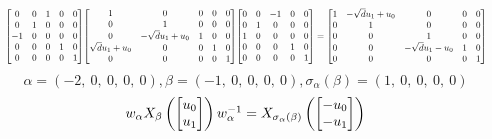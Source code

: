 \documentclass[11pt]{article}
\theoremstyle{definition}
\begin{document}
\[
\scaletoalign{\textwidth}{{\left[\begin{matrix}0 & 0 & 1 & 0 & 0\\0 & 1 & 0 & 0 & 0\\-1 & 0 & 0 & 0 & 0\\0 & 0 & 0 & 1 & 0\\0 & 0 & 0 & 0 & 1\end{matrix}\right]} {\left[\begin{matrix}1 & 0 & 0 & 0 & 0\\0 & 1 & 0 & 0 & 0\\0 & - \sqrt{d} u_{1} + u_{0} & 1 & 0 & 0\\\sqrt{d} u_{1} + u_{0} & 0 & 0 & 1 & 0\\0 & 0 & 0 & 0 & 1\end{matrix}\right]} {\left[\begin{matrix}0 & 0 & -1 & 0 & 0\\0 & 1 & 0 & 0 & 0\\1 & 0 & 0 & 0 & 0\\0 & 0 & 0 & 1 & 0\\0 & 0 & 0 & 0 & 1\end{matrix}\right]} = {\left[\begin{matrix}1 & - \sqrt{d} u_{1} + u_{0} & 0 & 0 & 0\\0 & 1 & 0 & 0 & 0\\0 & 0 & 1 & 0 & 0\\0 & 0 & - \sqrt{d} u_{1} - u_{0} & 1 & 0\\0 & 0 & 0 & 0 & 1\end{matrix}\right]}}
\]
\[
\alpha = \left( -2, \  0, \  0, \  0, \  0\right), \beta = \left( -1, \  0, \  0, \  0, \  0\right), \sigma_{\alpha}(\beta) = \left( 1, \  0, \  0, \  0, \  0\right)
\]
\[
\scaletoalign{\textwidth}{w_{\alpha} X_{\beta}\left(\left[\begin{matrix}u_{0}\\u_{1}\end{matrix}\right]\right) w_{\alpha}^{-1} = X_{\sigma_{\alpha}\left(\beta\right)}\left(\left[\begin{matrix}- u_{0}\\- u_{1}\end{matrix}\right]\right)}
\]
\end{document}
